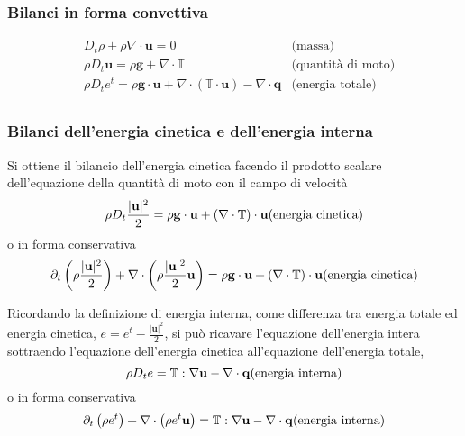 \subsubsection{Bilanci in forma convettiva}
\begin{equation}
\begin{aligned}
    & D_t \rho + \rho \nabla \cdot \mathbf{u} = 0 & \text{(massa)} \\
    & \rho D_t \mathbf{u} = \rho \mathbf{g} + \nabla \cdot \mathbb{T}  & \text{(quantità di moto)} \\
    & \rho D_t e^t  = \rho \mathbf{g} \cdot \mathbf{u} + \nabla \cdot \left( \mathbb{T} \cdot \mathbf{u} \right) - \nabla \cdot \mathbf{q}  &  \text{(energia totale)} \\
\end{aligned}
\end{equation}

\subsubsection{Bilanci dell'energia cinetica e dell'energia interna}
Si ottiene il bilancio dell'energia cinetica facendo il prodotto scalare dell'equazione della quantità di moto con il campo di velocità
\begin{equation}
    \rho D_t \dfrac{|\mathbf{u}|^2}{2} = \rho \mathbf{g} \cdot \mathbf{u} + \left( \nabla \cdot \mathbb{T} \right) \cdot \mathbf{u}  \hfill \text{(energia cinetica)} 
\end{equation}
o in forma conservativa
\begin{equation}
    \partial_t \left( \rho \dfrac{|\mathbf{u}|^2}{2} \right) + \nabla \cdot \left( \rho \dfrac{|\mathbf{u}|^2}{2} \mathbf{u} \right) = \rho \mathbf{g} \cdot \mathbf{u} + \left( \nabla \cdot \mathbb{T} \right) \cdot \mathbf{u}  \hfill \text{(energia cinetica)} 
\end{equation}

Ricordando la definizione di energia interna, come differenza tra energia totale ed energia cinetica, $e = e^t - \frac{|\mathbf{u}|^2}{2}$, si può ricavare l'equazione dell'energia intera sottraendo l'equazione dell'energia cinetica all'equazione dell'energia totale,
\begin{equation}
    \rho D_t e = \mathbb{T} : \nabla \mathbf{u} - \nabla \cdot \mathbf{q} \hfill \text{(energia interna)}
\end{equation}
o in forma conservativa
\begin{equation}
    \partial_t \left( \rho e^t \right) + \nabla \cdot \left( \rho e^t \mathbf{u} \right) =  \mathbb{T} : \nabla \mathbf{u} - \nabla \cdot \mathbf{q}   \hfill \text{(energia interna)} 
\end{equation}

